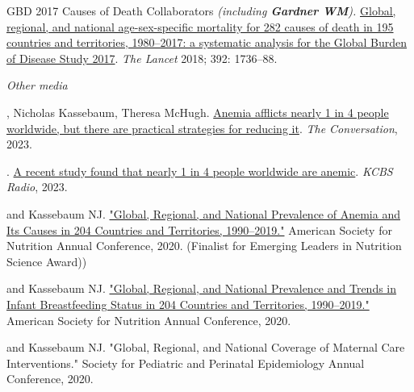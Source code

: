 \documentclass[11pt,article,oneside]{memoir}
\begin{document}
\ind GBD 2017 Causes of Death Collaborators \emph{(including \textbf{Gardner WM}).} \href{https://doi.org/10.1016/S0140-6736(18)32203-7}{Global, regional, and national age-sex-specific
mortality for 282 causes of death in 195 countries and territories, 1980--2017: a systematic analysis for the
Global Burden of Disease Study 2017}. \emph{The Lancet} 2018; 392: 1736--88.

\medskip 
\medskip

\noindent\emph{Other media \vspace{0.05in}}

, Nicholas Kassebaum, Theresa McHugh. \href{https://theconversation.com/anemia-afflicts-nearly-1-in-4-people-worldwide-but-there-are-practical-strategies-for-reducing-it-212177}{ 
Anemia afflicts nearly 1 in 4 people worldwide, but there are practical strategies for reducing it}. \emph{The Conversation}, 2023.

. \href{https://omny.fm/shows/kcbsam-on-demand/a-recent-study-found-that-nearly-1-in-four-people}{
	A recent study found that nearly 1 in 4 people worldwide are anemic}. \emph{KCBS Radio}, 2023.

\bigskip

\medskip

 and Kassebaum NJ. \href{https://doi.org/10.1093/cdn/nzaa053_035}{"Global, Regional, and National Prevalence of Anemia and Its
Causes in 204 Countries and Territories, 1990--2019."} American Society for Nutrition Annual Conference, 2020. (Finalist for Emerging 
Leaders in Nutrition Science Award))

 and Kassebaum NJ. \href{https://doi.org/10.1093/cdn/nzaa054_064}{"Global, Regional, and National Prevalence and Trends in Infant Breastfeeding Status in 204 Countries and Territories, 1990--2019."} 
American Society for Nutrition Annual Conference, 2020.

 and Kassebaum NJ. "Global, Regional, and National Coverage of Maternal Care
Interventions." Society for Pediatric and Perinatal Epidemiology Annual Conference, 2020. 

\bigskip 

\medskip
\end{document}
